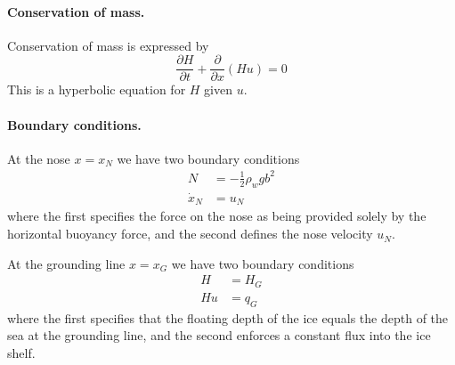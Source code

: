 \documentclass{jknotes}
\begin{document}
\paragraph{Conservation of mass.} Conservation of mass is expressed by
\begin{equation}
	\frac{\partial H}{\partial t} + \frac{\partial}{\partial x} (Hu) = 0
	\label{eq:l15:2}
\end{equation}
This is a hyperbolic equation for $H$ given $u$.

\paragraph{Boundary conditions.} At the nose $x=x_N$ we have two boundary
conditions
\begin{align}
	N &= -\frac{1}{2}\rho_w g b^2 \label{eq:l15:3}\\
	\dot{x}_N &= u_N \label{eq:l15:4}
\end{align}
where the first specifies the force on the nose as being provided solely by
the horizontal buoyancy force, and the second defines the nose velocity $u_N$.

At the grounding line $x=x_G$ we have two boundary conditions
\begin{align}
	H &= H_G \label{eq:l15:5}\\
	Hu &= q_G \label{eq:l15:6}
\end{align}
where the first specifies that the floating depth of the ice equals the depth
of the sea at the grounding line, and the second enforces a
constant flux into the ice shelf. 
\end{document}
